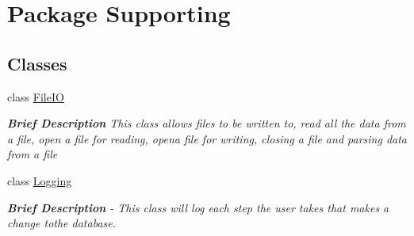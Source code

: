 \hypertarget{namespace_supporting}{}\section{Package Supporting}
\label{namespace_supporting}
\subsection*{Classes}
\begin{DoxyCompactItemize}
\item 
class \hyperlink{class_supporting_1_1_file_i_o}{File\+I\+O}
\begin{DoxyCompactList}\small\item\em {\bfseries Brief Description} This class allows files to be written to, read all the data from a file, open a file for reading, opena file for writing, closing a file and parsing data from a file \end{DoxyCompactList}\item 
class \hyperlink{class_supporting_1_1_logging}{Logging}
\begin{DoxyCompactList}\small\item\em {\bfseries Brief Description} -\/ This class will log each step the user takes that makes a change tothe database. \end{DoxyCompactList}\end{DoxyCompactItemize}
